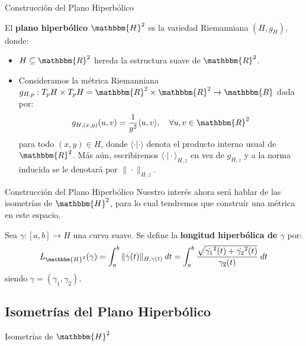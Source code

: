 \documentclass[xcolor=dvipsnames]{beamer}
\theoremstyle{largebreak}
\newcommand\cf[3]{\ensuremath{#1:#2\rightarrow#3}}
\newcommand{\bbm}[1]{\ensuremath{\mathbbm{#1}}}
\newcommand{\norm}[1]{\|#1\|}
\begin{document}
\begin{frame}{Construcción del Plano Hiperbólico}
    \begin{mydef}
        El \textbf{plano hiperbólico} $\bbm{H}^2$ es la variedad Riemanniana $(H,g_H)$, donde:
        \begin{itemize}
            \item $H\subseteq\bbm{R}^2$ hereda la estructura suave de $\bbm{R}^2$.
            \item Consideramos la métrica Riemanniana $\cf{g_{H,p}}{T_pH\times T_pH=\bbm{R}^2\times \bbm{R}^2}{\bbm{R}}$ dada por:
            \begin{equation*}
                g_{H,(x,y)}(u,v)=\frac{1}{y^2}\langle u,v\rangle,\quad\forall u,v\in\bbm{R}^2
            \end{equation*}
            para todo $(x,y)\in H$, donde $\langle\cdot\big|\cdot \rangle$ denota el producto interno usual de $\bbm{R}^2$. Más aún, escribiremos $\langle\cdot\big|\cdot \rangle_{ H,z}$ en vez de $g_{H,z}$ y a la norma inducida se le denotará por $\norm{\cdot}_{H,z}$.
        \end{itemize}
    \end{mydef}
\end{frame}

\begin{frame}{Construcción del Plano Hiperbólico}
    Nuestro interés ahora será hablar de las isometrías de $\bbm{H}^2$, para lo cual tendremos que construír una métrica en este espacio.
    
    \begin{mydef}
        Sea $\cf{\gamma}{[a,b]}{H}$ una curva suave. Se define la \textbf{longitud hiperbólica de $\gamma$} por:
        \begin{equation*}
            L_{\bbm{H}^2}(\gamma)=\int_{a}^{b}\norm{\dot{\gamma}(t)}_{ H,\gamma(t)}\:dt=\int_{a}^{b}\frac{\sqrt{\dot{\gamma_1}^2(t)+\dot{\gamma_2}^2(t)}}{\gamma_2(t)}\:dt
        \end{equation*}
        siendo $\gamma=(\gamma_1,\gamma_2)$.
    \end{mydef}
\end{frame}

\subsection{Isometrías del Plano Hiperbólico}

\begin{frame}
    \begin{center}
        Isometrías de $\bbm{H}^2$
    \end{center}
\end{frame}
\end{document}
